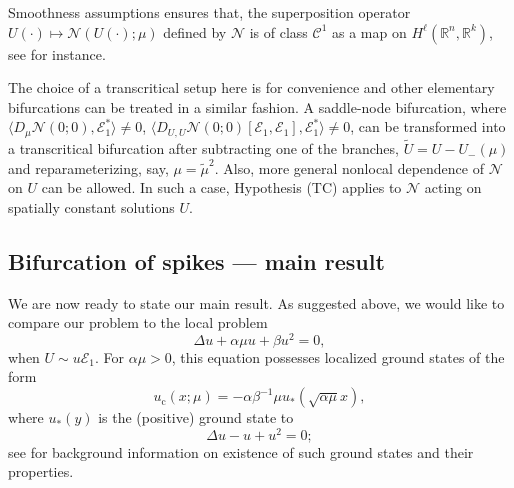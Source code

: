 \documentclass[10pt]{article}
\newcommand{\R}{\mathbb{R}}
\newcommand{\Nl}{\mathcal{N}}
\begin{document}
Smoothness assumptions ensures that, the superposition operator $U(\cdot) \mapsto \Nl(U(\cdot);\mu)$ defined by $\Nl$ is of class $\mathscr{C}^1$ as a map on $H^\ell(\R^n,\R^k)$, see \cite{runst1996sobolev} for instance.

The choice of a transcritical setup here is for convenience and other elementary bifurcations can be treated in a similar fashion. A saddle-node bifurcation, where $\langle D_{\mu} \Nl(0;0), \mathcal{E}_1^*\rangle \neq 0$,  $\langle D_{U,U} \Nl(0;0)[\mathcal{E}_1,\mathcal{E}_1], \mathcal{E}_1^*\rangle \neq 0$, can be transformed into a transcritical bifurcation after subtracting one of the branches, $\tilde{U}=U-U_-(\mu)$ and reparameterizing, say, $\mu=\tilde{\mu}^2$. Also, more general nonlocal dependence of $\Nl$ on $U$ can be allowed. In such a case, Hypothesis (TC) applies to $\Nl$ acting on spatially constant solutions $U$.


\subsection{Bifurcation of spikes --- main result}\label{s:res}

We are now ready to state our main result. As suggested above, we would like to compare our problem to the local problem 
\begin{equation}\label{e:gs}
\Delta u + \alpha\mu u + \beta u^2=0,
\end{equation}
when $U\sim u\mathcal{E}_1$. For $\alpha\mu>0$, this equation possesses localized ground states of the form 
\begin{equation}\label{e:gs00}
u_\mathrm{c}(x;\mu)=-\alpha\beta^{-1}\mu u_*(\sqrt{\alpha\mu} x),
\end{equation}
where $u_*(y)$ is the (positive) ground state to 
\begin{equation}\label{e:gs0}
\Delta u -  u + u^2=0;
\end{equation}
see \cite{gs} for background information on existence of such ground states and their properties. 
\end{document}
